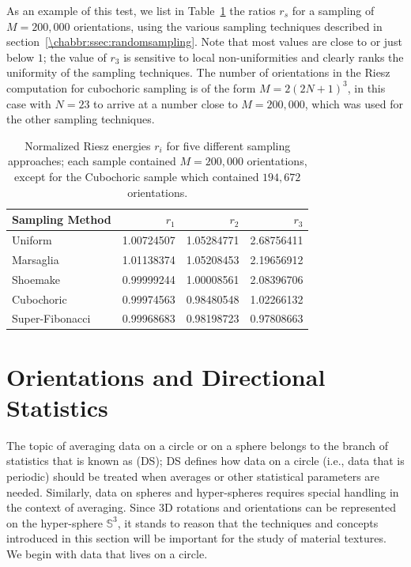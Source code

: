 As an example of this test, we list in Table~\ref{\chabbr:tb:Riesz} the ratios $r_s$ for a sampling of $M=200,000$ orientations, using the various sampling techniques described in section~\ref{\chabbr:ssec:randomsampling}.  Note that most values are close to or just below $1$; the value of $r_3$ is sensitive to local non-uniformities and clearly ranks the uniformity of the sampling techniques.  The number of orientations in the Riesz computation for cubochoric sampling is of the form $M=2(2N+1)^3$, in this case with $N=23$ to arrive at a number close to $M=200,000$, which was used for the other sampling techniques.

\begin{table}[h]
\centering\leavevmode
\begin{tabular}{|l|r|r|r|}
\hline
Sampling Method &   $r_1$   &   $r_2$ & $r_3$ \\
\hline
Uniform &                  1.00724507 &    1.05284771 &     2.68756411 \\
Marsaglia &               1.01138374 &    1.05208453 &     2.19656912 \\
Shoemake &              0.99999244 &    1.00008561 &    2.08396706 \\
Cubochoric &             0.99974563 &    0.98480548 &    1.02266132 \\
Super-Fibonacci &     0.99968683 &    0.98198723 &    0.97808663 \\
\hline
\end{tabular}
\caption{\label{\chabbr:tb:Riesz}Normalized Riesz energies $r_i$ for five different sampling approaches; each sample contained $M=200,000$ orientations, except for the Cubochoric sample which contained $194,672$ orientations.}
\end{table}

%
%

\section{Orientations and Directional Statistics}\label{\chabbr:sec:orientationaveraging}
The topic of averaging data on a circle or on a sphere belongs to the branch of statistics that is known as  (DS); DS defines how data on a circle (i.e., data that is periodic) should be treated when averages or other statistical parameters are needed. Similarly, data on spheres and hyper-spheres requires special handling in the context of averaging.  Since 3D rotations and orientations can be represented on the hyper-sphere $\mathbb{S}^3$, it stands to reason that the techniques and concepts introduced in this section will be important for the study of material textures.  We begin with data that lives on a circle.

